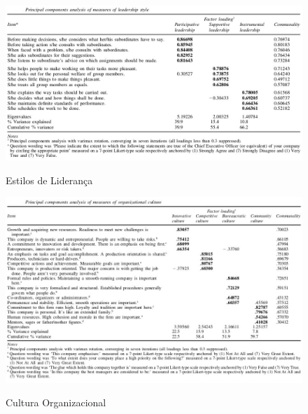 {\begin{figure}[H]
\centering
\includegraphics[scale=.5]{"./image/OB/Leadership.jpg"}\\
\caption{Estilos de Liderança}
\end{figure}\par
\vspace{1cm}
\begin{figure}[H]
\centering
\includegraphics[scale=.6]{"./image/OB/Culture.jpg"}\\
\caption{Cultura Organizacional}
\end{figure}\par

}
